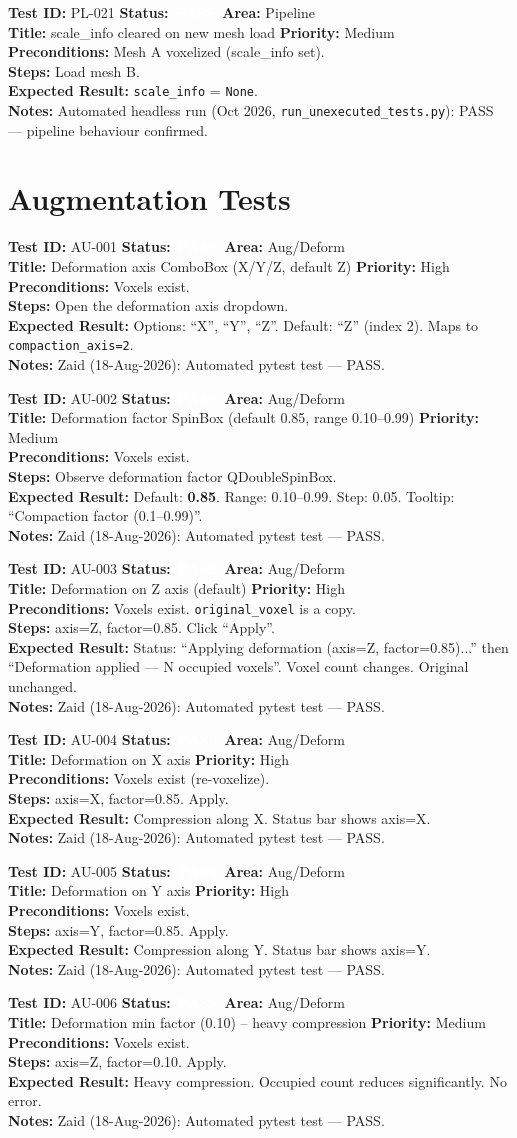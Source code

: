 \documentclass[12pt,a4paper]{article}
\newcommand{\statuspass}{\colorbox{statusgreen}{\textcolor{white}{\textbf{\,PASS\,}}}}
\newcommand{\testcase}[9]{%
  \smallskip
  \noindent\textbf{Test ID:} #1 \hfill \textbf{Status:} #2 \hfill \textbf{Area:} #3 \\
  \textbf{Title:} #4 \hfill \textbf{Priority:} #5 \\[0.3em]
  \textbf{Preconditions:} #6 \\[0.3em]
  \textbf{Steps:} #7 \\[0.3em]
  \textbf{Expected Result:} #8 \\
  \textbf{Notes:} #9
  \smallskip
}
\begin{document}
\testcase{PL-021}{\statuspass}{Pipeline}{scale\_info cleared on new mesh load}{Medium}{Mesh A voxelized (scale\_info set).}{Load mesh B.}{\texttt{scale\_info} = \texttt{None}.}{Automated headless run (Oct 2026, \texttt{run\_unexecuted\_tests.py}): PASS --- pipeline behaviour confirmed.}



\section{Augmentation Tests}

\testcase{AU-001}{\statuspass}{Aug/Deform}{Deformation axis ComboBox (X/Y/Z, default Z)}{High}{Voxels exist.}{Open the deformation axis dropdown.}{Options: ``X'', ``Y'', ``Z''. Default: ``Z'' (index 2). Maps to \texttt{compaction\_axis=2}.}{Zaid (18-Aug-2026): Automated pytest test --- PASS.}


\testcase{AU-002}{\statuspass}{Aug/Deform}{Deformation factor SpinBox (default 0.85, range 0.10--0.99)}{Medium}{Voxels exist.}{Observe deformation factor QDoubleSpinBox.}{Default: \textbf{0.85}. Range: 0.10--0.99. Step: 0.05. Tooltip: ``Compaction factor (0.1--0.99)''.}{Zaid (18-Aug-2026): Automated pytest test --- PASS.}


\testcase{AU-003}{\statuspass}{Aug/Deform}{Deformation on Z axis (default)}{High}{Voxels exist. \texttt{original\_voxel} is a copy.}{axis=Z, factor=0.85. Click ``Apply''.}{Status: ``Applying deformation (axis=Z, factor=0.85)...'' then ``Deformation applied --- N occupied voxels''. Voxel count changes. Original unchanged.}{Zaid (18-Aug-2026): Automated pytest test --- PASS.}


\testcase{AU-004}{\statuspass}{Aug/Deform}{Deformation on X axis}{High}{Voxels exist (re-voxelize).}{axis=X, factor=0.85. Apply.}{Compression along X. Status bar shows axis=X.}{Zaid (18-Aug-2026): Automated pytest test --- PASS.}


\testcase{AU-005}{\statuspass}{Aug/Deform}{Deformation on Y axis}{High}{Voxels exist.}{axis=Y, factor=0.85. Apply.}{Compression along Y. Status bar shows axis=Y.}{Zaid (18-Aug-2026): Automated pytest test --- PASS.}


\testcase{AU-006}{\statuspass}{Aug/Deform}{Deformation min factor (0.10) -- heavy compression}{Medium}{Voxels exist.}{axis=Z, factor=0.10. Apply.}{Heavy compression. Occupied count reduces significantly. No error.}{Zaid (18-Aug-2026): Automated pytest test --- PASS.}
\end{document}
